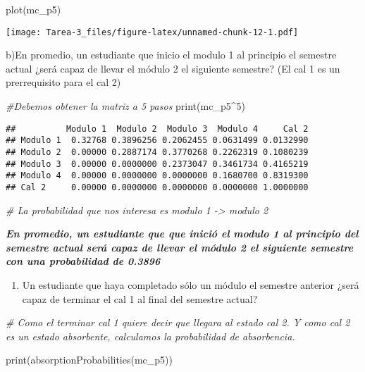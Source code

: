\documentclass[
]{article}
\newenvironment{Shaded}{\begin{snugshade}}{\end{snugshade}}
\newcommand{\CommentTok}[1]{\textcolor[rgb]{0.56,0.35,0.01}{\textit{#1}}}
\newcommand{\DecValTok}[1]{\textcolor[rgb]{0.00,0.00,0.81}{#1}}
\newcommand{\FunctionTok}[1]{\textcolor[rgb]{0.00,0.00,0.00}{#1}}
\newcommand{\NormalTok}[1]{#1}
\newcommand{\SpecialCharTok}[1]{\textcolor[rgb]{0.00,0.00,0.00}{#1}}
\providecommand{\tightlist}{%
  \setlength{\itemsep}{0pt}\setlength{\parskip}{0pt}}
\begin{document}
\begin{Shaded}
\begin{Highlighting}[]
\FunctionTok{plot}\NormalTok{(mc\_p5)}
\end{Highlighting}
\end{Shaded}

\texttt{[image: Tarea-3\_files/figure-latex/unnamed-chunk-12-1.pdf]}

b)En promedio, un estudiante que inicio el modulo 1 al principio el
semestre actual ¿será capaz de llevar el módulo 2 el siguiente semestre?
(El cal 1 es un prerrequisito para el cal 2)

\begin{Shaded}
\begin{Highlighting}[]
\CommentTok{\#Debemos obtener la matriz a 5 pasos}
\FunctionTok{print}\NormalTok{(mc\_p5}\SpecialCharTok{\^{}}\DecValTok{5}\NormalTok{)}
\end{Highlighting}
\end{Shaded}

\begin{verbatim}
##          Modulo 1  Modulo 2  Modulo 3  Modulo 4     Cal 2
## Modulo 1  0.32768 0.3896256 0.2062455 0.0631499 0.0132990
## Modulo 2  0.00000 0.2887174 0.3770268 0.2262319 0.1080239
## Modulo 3  0.00000 0.0000000 0.2373047 0.3461734 0.4165219
## Modulo 4  0.00000 0.0000000 0.0000000 0.1680700 0.8319300
## Cal 2     0.00000 0.0000000 0.0000000 0.0000000 1.0000000
\end{verbatim}

\begin{Shaded}
\begin{Highlighting}[]
\CommentTok{\# La probabilidad que nos interesa es modulo 1 {-}\textgreater{} modulo 2}
\end{Highlighting}
\end{Shaded}

\textbf{\emph{En promedio, un estudiante que que inició el modulo 1 al
principio del semestre actual será capaz de llevar el módulo 2 el
siguiente semestre con una probabilidad de 0.3896 }}

\begin{enumerate}
\def\labelenumi{\alph{enumi})}
\setcounter{enumi}{2}
\tightlist
\item
  Un estudiante que haya completado sólo un módulo el semestre anterior
  ¿será capaz de terminar el cal 1 al final del semestre actual?
\end{enumerate}

\begin{Shaded}
\begin{Highlighting}[]
\CommentTok{\# Como el terminar cal 1 quiere decir que llegara al estado cal 2. Y como cal 2 es un estado absorbente, calculamos la probabilidad de absorbencia.}

\FunctionTok{print}\NormalTok{(}\FunctionTok{absorptionProbabilities}\NormalTok{(mc\_p5))}
\end{Highlighting}
\end{Shaded}
\end{document}

